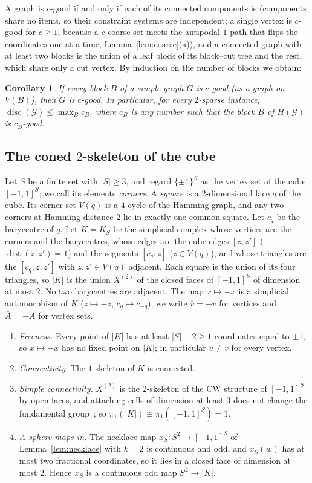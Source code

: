 \documentclass[11pt,letterpaper]{article}
\newtheorem{corollary}[theorem]{Corollary}
\theoremstyle{definition}
\newcommand{\cG}{\mathcal{G}}
\newcommand{\cube}[1]{\{\pm1\}^{#1}}
\DeclareMathOperator{\disc}{disc}
\DeclareMathOperator{\dist}{dist}
\begin{document}
A graph is $c$-good if and only if each of its connected components is (components share no items,
so their constraint systems are independent; a single vertex is $c$-good for $c\ge1$, because a
$c$-coarse set meets the antipodal $1$-path that flips the coordinates one at a time,
Lemma~\ref{lem:coarse}(a)), and a connected graph with
at least two blocks is the union of a leaf block of its block--cut tree and the rest, which share
only a cut vertex. By induction on the number of blocks we obtain:

\begin{corollary}\label{cor:onesum}
If every block $B$ of a simple graph $G$ is $c$-good (as a graph on $V(B)$), then $G$ is
$c$-good. In particular, for every $2$-sparse instance, $\disc(\cG)\le\max_Bc_B$, where $c_B$ is
any number such that the block $B$ of $H(\cG)$ is $c_B$-good.
\end{corollary}

\subsection{The coned \texorpdfstring{$2$}{2}-skeleton of the cube}\label{sec:complex}

Let $S$ be a finite set with $|S|\ge3$, and regard $\cube S$ as the vertex set of the cube
$[-1,1]^S$; we call its elements \emph{corners}. A \emph{square} is a $2$-dimensional face $q$ of
the cube. Its corner set $V(q)$ is a $4$-cycle of the Hamming graph, and any two corners at Hamming
distance $2$ lie in exactly one common square. Let $c_q$ be the barycentre of $q$. Let $K=K_S$ be
the simplicial complex whose vertices are the corners and the barycentres, whose edges are the cube
edges $[z,z']$ ($\dist(z,z')=1$) and the segments $[c_q,z]$ ($z\in V(q)$), and whose triangles are
the $[c_q,z,z']$ with $z,z'\in V(q)$ adjacent. Each square is the union of its four triangles, so
$|K|$ is the union $X^{(2)}$ of the closed faces of $[-1,1]^S$ of dimension at most $2$. No two
barycentres are adjacent. The map $x\mapsto-x$ is a simplicial automorphism of $K$ ($z\mapsto-z$,
$c_q\mapsto c_{-q}$); we write $\bar v=-v$ for vertices and $\bar A=-A$ for vertex sets.
\begin{enumerate}[label=(K\arabic*),itemsep=0pt]
\item \emph{Freeness.} Every point of $|K|$ has at least $|S|-2\ge1$ coordinates equal to $\pm1$,
so $x\mapsto-x$ has no fixed point on $|K|$; in particular $\bar v\ne v$ for every vertex.
\item \emph{Connectivity.} The $1$-skeleton of $K$ is connected.
\item \emph{Simple connectivity.} $X^{(2)}$ is the $2$-skeleton of the CW structure of $[-1,1]^S$
by open faces, and attaching cells of dimension at least $3$ does not change the fundamental
group~\cite[Proposition~1.26]{Hat02}; so $\pi_1(|K|)\cong\pi_1([-1,1]^S)=1$.
\item \emph{A sphere maps in.} The necklace map $x_S\colon S^2\to[-1,1]^S$ of
Lemma~\ref{lem:necklace} with $k=2$ is continuous and odd, and $x_S(w)$ has at most two fractional
coordinates, so it lies in a closed face of dimension at most $2$. Hence $x_S$ is a continuous odd
map $S^2\to|K|$.
\end{enumerate}
\end{document}
